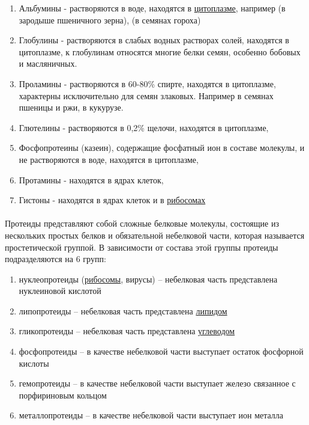 \begin{enumerate}

\item Альбумины - растворяются в воде, находятся в \hyperlink{citoplasma}{цитоплазме}, например  (в зародыше пшеничного зерна),  (в семянах гороха)
\item Глобулины - растворяются в слабых водных растворах солей, находятся в цитоплазме, к глобулинам относятся многие белки семян, особенно бобовых и масляничных.
\item Проламины - растворяются в 60-80\% спирте, находятся в цитоплазме, характерны исключительно для семян злаковых. Например  в семянах пшеницы и ржи,  в кукурузе.
\item Глютелины - растворяются в 0,2\% щелочи, находятся в цитоплазме,
\item Фосфопротеины (казеин), содержащие фосфатный ион в составе молекулы, и не растворяются в воде, находятся в цитоплазме,
\item Протамины - находятся в ядрах клеток,
\item Гистоны - находятся в ядрах клеток и в \hyperlink{sect_rybosoms}{рибосомах}

\end{enumerate}

\paragraph*{}Протеиды представляют собой сложные белковые молекулы, состоящие из нескольких простых белков и обязательной небелковой части, которая называется простетической группой. В зависимости от состава этой группы протеиды подразделяются на 6 групп:

\begin{enumerate}

	\item нуклеопротеиды (\hyperlink{sect_rybosoms}{рибосомы}, вирусы) -- небелковая часть представлена нуклеиновой кислотой
	\item липопротеиды -- небелковая часть представлена \hyperlink{sect_lipids}{липидом}
	\item гликопротеиды -- небелковая часть представлена \hyperlink{sect_glycosids}{углеводом}
	\item фосфопротеиды -- в качестве небелковой части выступает остаток фосфорной кислоты
	\item гемопротеиды -- в качестве небелковой части выступает железо связанное с порфириновым кольцом
	\item металлопротеиды -- в качестве небелковой части выступает ион металла

\end{enumerate}

